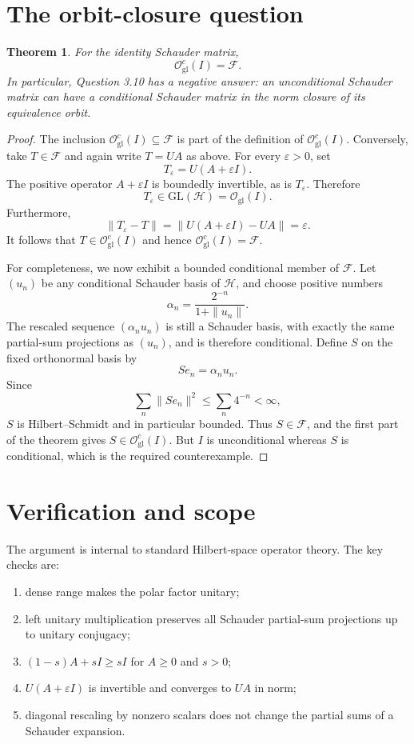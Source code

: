 \documentclass[11pt]{article}
\newtheorem{theorem}{Theorem}
\newcommand{\Hh}{\mathcal H}
\newcommand{\Ff}{\mathcal F}
\newcommand{\Ogl}{\mathcal O_{\mathrm{gl}}}
\begin{document}
\section{The orbit-closure question}

\begin{theorem}\label{thm:closure}
For the identity Schauder matrix,
\[
 \Ogl^c(I)=\Ff.
\]
In particular, Question 3.10 has a negative answer: an unconditional
Schauder matrix can have a conditional Schauder matrix in the norm closure
of its equivalence orbit.
\end{theorem}

\begin{proof}
The inclusion $\Ogl^c(I)\subseteq\Ff$ is part of the definition of
$\Ogl^c(I)$.  Conversely, take $T\in\Ff$ and again write $T=UA$ as above.
For every $\varepsilon>0$, set
\[
 T_\varepsilon=U(A+\varepsilon I).
\]
The positive operator $A+\varepsilon I$ is boundedly invertible, as is
$T_\varepsilon$.  Therefore
\[
 T_\varepsilon\in\mathrm{GL}(\Hh)=\Ogl(I).
\]
Furthermore,
\[
 \|T_\varepsilon-T\|
 =\|U(A+\varepsilon I)-UA\|=\varepsilon.
\]
It follows that $T\in\Ogl^c(I)$ and hence $\Ogl^c(I)=\Ff$.

For completeness, we now exhibit a bounded conditional member of $\Ff$.
Let $(u_n)$ be any conditional Schauder basis of $\Hh$, and choose positive
numbers
\[
 \alpha_n=\frac{2^{-n}}{1+\|u_n\|}.
\]
The rescaled sequence $(\alpha_nu_n)$ is still a Schauder basis, with exactly
the same partial-sum projections as $(u_n)$, and is therefore conditional.
Define $S$ on the fixed orthonormal basis by
\[
 Se_n=\alpha_nu_n.
\]
Since
\[
 \sum_n\|Se_n\|^2\le\sum_n4^{-n}<\infty,
\]
$S$ is Hilbert--Schmidt and in particular bounded.  Thus $S\in\Ff$, and the
first part of the theorem gives $S\in\Ogl^c(I)$.  But $I$ is unconditional
whereas $S$ is conditional, which is the required counterexample.
\end{proof}

\section{Verification and scope}

The argument is internal to standard Hilbert-space operator theory.  The key
checks are:
\begin{enumerate}
  \item dense range makes the polar factor unitary;
  \item left unitary multiplication preserves all Schauder partial-sum
        projections up to unitary conjugacy;
  \item $(1-s)A+sI\ge sI$ for $A\ge0$ and $s>0$;
  \item $U(A+\varepsilon I)$ is invertible and converges to $UA$ in norm;
  \item diagonal rescaling by nonzero scalars does not change the partial
        sums of a Schauder expansion.
\end{enumerate}
\end{document}
